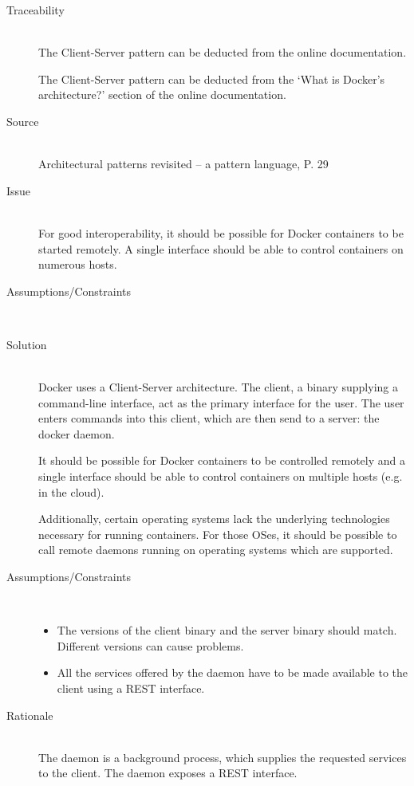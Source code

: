 \begin{description}
\item [Traceability]~\\
The Client-Server pattern can be deducted from the online documentation\cite{dockerarchi}.

The Client-Server pattern can be deducted from the `What is Docker’s architecture?' section of the online documentation\cite{dockerarchi}.

\item [Source]~\\
Architectural patterns revisited -- a pattern language, P. 29 \cite{avgeriou2005architectural}

\item [Issue]~\\
For good interoperability, it should be possible for Docker containers to be started remotely. A single interface should be able to control containers on numerous hosts.

\item [Assumptions/Constraints]~

\item [Solution]~\\
Docker uses a Client-Server architecture. The client, a binary supplying a command-line interface, act as the primary interface for the user. The user enters commands into this client, which are then send to a server: the docker daemon. 


It should be possible for Docker containers to be controlled remotely and a single interface should be able to control containers on multiple hosts (e.g. in the cloud).

Additionally, certain operating systems lack the underlying technologies necessary for running containers. For those OSes, it should be possible to call remote daemons running on operating systems which are supported. %

\item [Assumptions/Constraints]~
\begin{itemize}
\item The versions of the client binary and the server binary should match. Different versions can cause problems.
\item All the services offered by the daemon have to be made available to the client using a REST interface.
\end{itemize}

\item [Rationale] ~\\
The daemon is a background process, which supplies the requested services to the client. The daemon exposes a REST interface.


\end{description}
